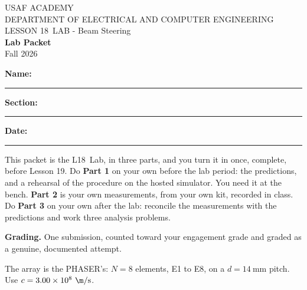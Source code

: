 \documentclass{exam}
\def\labLesson{18}
\def\thisterm{\thisTermIn}
\def\thisterm{Fall 2026}
\begin{document}
\pagestyle{headandfoot}   %



\begin{center}
USAF ACADEMY \\
DEPARTMENT OF ELECTRICAL AND COMPUTER ENGINEERING \\
LESSON \labLesson\ LAB - Beam Steering \\
\textbf{Lab Packet} \\
\thisterm \\[4mm]
\end{center}

\vspace{-4pt}
\textbf{Name:} \rule[-2pt]{2.6in}{0.4pt} \hfill
\textbf{Section:} \rule[-2pt]{0.9in}{0.4pt} \hfill
\textbf{Date:} \rule[-2pt]{1.1in}{0.4pt}

\vspace{4pt}


\vspace{2pt}

This packet is the L\labLesson\ Lab, in three parts, and you turn it in once, complete,
before Lesson 19. Do \textbf{Part 1} on your own before the lab period: the
predictions, and a rehearsal of the procedure on the hosted simulator. You need
it at the bench. \textbf{Part 2} is your own measurements, from your own kit,
recorded in class. Do
\textbf{Part 3} on your own after the lab: reconcile the measurements with the
predictions and work three analysis problems.

\textbf{Grading.} One submission, counted toward your engagement grade and
graded as a genuine, documented attempt.

The array is the PHASER's: $N = 8$ elements, E1 to E8, on a $d = 14\ \text{mm}$
pitch. Use $c = 3.00\times 10^{8}\ \m/\text{s}$.
\end{document}
